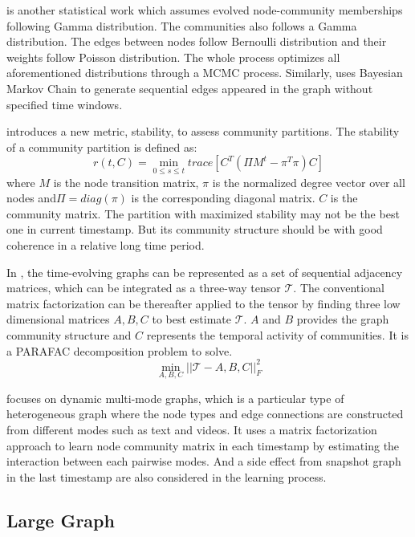 \cite{yang2018poisson} is another statistical work which assumes evolved node-community memberships following Gamma distribution. The communities also follows a Gamma distribution. The edges between nodes follow Bernoulli distribution and their weights follow Poisson distribution. The whole process optimizes all aforementioned distributions through a MCMC process. Similarly,  \cite{peixoto2017modelling} uses Bayesian Markov Chain to generate sequential edges appeared in the graph without specified time windows. 

\cite{delvenne2010stability} introduces a new metric, stability, to assess community partitions. The stability of a community partition is defined as:
\begin{equation}
	r(t,C) = \min_{0 \leq s \leq t} trace[C^T(\Pi M^t -\pi^T \pi)C]
\end{equation}
where $M$ is the node transition matrix, $\pi$ is the normalized degree vector over all nodes and$\Pi = diag(\pi)$ is the corresponding diagonal matrix. $C$ is the community  matrix. The partition with maximized stability may not be the best one in current timestamp. But its community structure should be with good coherence in a relative long time period.

In \cite{gauvin2014detecting}, the time-evolving graphs can be represented as a set of sequential adjacency matrices, which can be integrated as a three-way tensor $\mathcal{T}$. The conventional matrix factorization can be thereafter applied to the tensor by finding three low dimensional matrices $A,B,C$ to best estimate $\mathcal{T}$. $A$ and $B$ provides the graph community structure and $C$ represents the temporal activity of communities. It is a PARAFAC decomposition problem to solve.
\begin{equation} 
\min_{A,B,C} ||\mathcal{T} - A,B,C||^2_F
\end{equation}

\cite{tang2011identifying} focuses on dynamic multi-mode graphs, which is a particular type of heterogeneous graph where the node types and edge connections are constructed from different modes such as text and videos. It uses a matrix factorization approach to learn node community matrix in each timestamp by estimating the interaction between each pairwise modes. And a side effect from snapshot graph in the last timestamp are also considered in the learning process.

\subsection{Large Graph}

